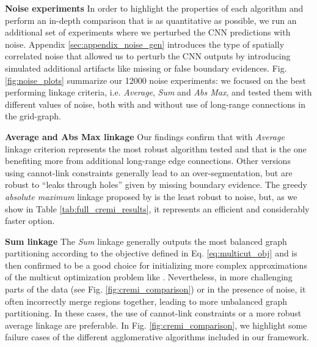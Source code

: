 \textbf{Noise experiments } In order to highlight the properties of each \algname{} algorithm and  perform an in-depth comparison that is as quantitative as possible, we run an additional set of experiments where we perturbed the CNN predictions with noise. Appendix \ref{sec:appendix_noise_gen} introduces the type of spatially correlated noise that allowed us to perturb the CNN outputs by introducing simulated additional artifacts like missing or false boundary evidences.  
Fig. \ref{fig:noise_plots} summarize our 12000 noise experiments: we focused on the best performing linkage criteria, i.e. \emph{Average}, \emph{Sum} and \emph{Abs Max}, and tested them with different values of noise, both with and without use of long-range connections in the grid-graph. %

\textbf{Average and Abs Max linkage } Our findings confirm that \algname{} with \emph{Average} linkage criterion represents the most robust algorithm tested and that is the one benefiting more from additional long-range edge connections. Other versions using cannot-link constraints generally lead to an over-segmentation, but are robust to ``leaks through holes'' given by missing boundary evidence. The greedy \emph{absolute maximum} linkage proposed by \cite{wolf2018mutex} is the least robust to noise, but, as we show in Table \ref{tab:full_cremi_results}, it represents an efficient and considerably faster option.   

\textbf{Sum linkage } The \emph{Sum} linkage generally outputs the most balanced graph partitioning according to the objective defined in Eq. \ref{eq:multicut_obj} and is then confirmed to be a good choice for initializing more complex approximations of the multicut optimization problem like \cite{beier2016efficient}. Nevertheless, in more challenging parts of the data (see Fig. \ref{fig:cremi_comparison}) or in the presence of noise, it often incorrectly merge regions together, leading to more unbalanced graph partitioning. In these cases, the use of cannot-link constraints or a more robust average linkage are preferable.  
In Fig. \ref{fig:cremi_comparison}, we highlight some failure cases of the different agglomerative algorithms included in our framework.


